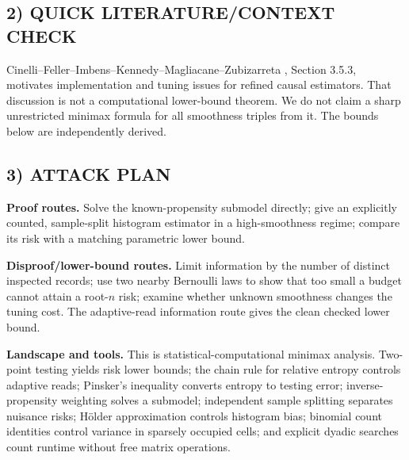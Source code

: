 \documentclass[11pt,a4paper]{article}
\theoremstyle{definition}
\begin{document}
\subsection*{2) QUICK LITERATURE/CONTEXT CHECK}
Cinelli--Feller--Imbens--Kennedy--Magliacane--Zubizarreta \cite{CausalChallenges}, Section 3.5.3, motivates implementation and tuning issues for refined causal estimators. That discussion is not a computational lower-bound theorem. We do not claim a sharp unrestricted minimax formula for all smoothness triples from it. The bounds below are independently derived.

\subsection*{3) ATTACK PLAN}
\textbf{Proof routes.} Solve the known-propensity submodel directly; give an explicitly counted, sample-split histogram estimator in a high-smoothness regime; compare its risk with a matching parametric lower bound.

\textbf{Disproof/lower-bound routes.} Limit information by the number of distinct inspected records; use two nearby Bernoulli laws to show that too small a budget cannot attain a root-$n$ risk; examine whether unknown smoothness changes the tuning cost. The adaptive-read information route gives the clean checked lower bound.

\textbf{Landscape and tools.} This is statistical-computational minimax analysis. Two-point testing yields risk lower bounds; the chain rule for relative entropy controls adaptive reads; Pinsker's inequality converts entropy to testing error; inverse-propensity weighting solves a submodel; independent sample splitting separates nuisance risks; H\"older approximation controls histogram bias; binomial count identities control variance in sparsely occupied cells; and explicit dyadic searches count runtime without free matrix operations.
\end{document}
